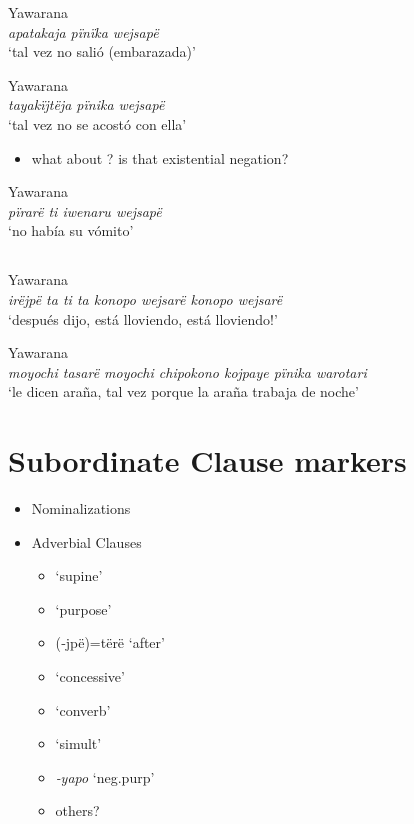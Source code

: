 \documentclass{memoir}
\begin{document}
\ex Yawarana \\
\label{ctoaragrme-39}    \textit{apatakaja pïnïka wejsapë }\\
        ‘tal vez no salió (embarazada)’ \xe

\ex Yawarana \\
\label{ctoaragrme-40}    \textit{tayakïjtëja pïnika wejsapë }\\
        ‘tal vez no se acostó con ella’ \xe

\begin{itemize}
\tightlist
\item
  what about ? is that existential negation?
\end{itemize}

\ex Yawarana \\
\label{ctorat-19}    \textit{pïrarë ti iwenaru wejsapë }\\
        ‘no había su vómito’ \xe

\subsection{\texorpdfstring{}{}}

\ex Yawarana \\
\label{ctorat-25}    \textit{irëjpë ta ti ta konopo wejsarë konopo wejsarë }\\
        ‘después dijo, está lloviendo, está lloviendo!’ \xe

\ex Yawarana \\
\label{ctoaragrme-25}    \textit{moyochi tasarë moyochi chipokono kojpaye pïnika warotari }\\
        ‘le dicen araña, tal vez porque la araña trabaja de noche’ \xe

\section{Subordinate Clause markers}

\begin{itemize}
\tightlist
\item
  Nominalizations
\item
  Adverbial Clauses

  \begin{itemize}
  \tightlist
  \item
     `supine'
  \item
     `purpose'
  \item
    (‑jpë)=tërë `after'
  \item
     `concessive'
  \item
     `converb'
  \item
     `simult'
  \item
    \emph{‑yapo} `neg.purp'
  \item
    others?
  \end{itemize}
\end{itemize}
\end{document}
